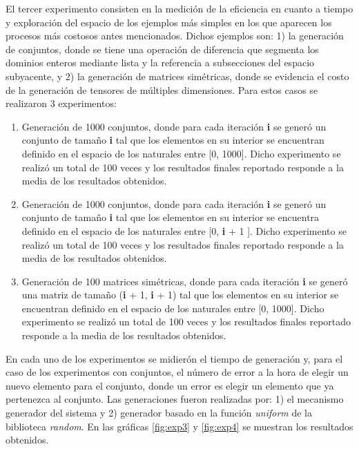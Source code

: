 El tercer experimento consisten en la medición de la eficiencia en cuanto a tiempo y exploración
del espacio de los ejemplos más simples en los que aparecen los procesos más costosos antes
mencionados. Dichos ejemplos son: 1) la generación de conjuntos, donde se tiene una operación de
diferencia que segmenta los dominios enteros mediante lista y la referencia a subsecciones del
espacio subyacente, y 2) la generación de matrices simétricas, donde se evidencia el costo de
la generación de tensores de múltiples dimensiones. Para estos casos se realizaron 3 experimentos:
\begin{enumerate}
      \item Generación de 1000 conjuntos, donde para cada iteración {\bf i} se generó un conjunto de tamaño {\bf i}
            tal que los elementos en su interior se encuentran definido en el espacio de los naturales entre
                  [0, 1000]. Dicho experimento se realizó un total de 100 veces y los resultados finales reportado
            responde a la media de los resultados obtenidos.
      \item Generación de 1000 conjuntos, donde para cada iteración {\bf i} se generó un conjunto de tamaño {\bf i}
            tal que los elementos en su interior se encuentra definido en el espacio de los naturales entre
                  [0, {\bf i} + 1 ]. Dicho experimento se realizó un total de 100 veces y los resultados finales reportado
            responde a la media de los resultados obtenidos.
      \item Generación de 100 matrices simétricas, donde para cada iteración {\bf i} se generó una matriz de
            tamaño ({\bf i} + 1, {\bf i} + 1) tal que los elementos en su interior se encuentran definido en el espacio de los
            naturales entre [0, 1000]. Dicho experimento se realizó un total de 100 veces y los resultados
            finales reportado responde a la media de los resultados obtenidos.
\end{enumerate}


En cada uno de los experimentos se midierón el tiempo de generación y, para el caso de los experimentos
con conjuntos, el número de error a la hora de elegir un nuevo elemento para el conjunto, donde un error
es elegir un elemento que ya pertenezca al conjunto. Las generaciones fueron realizadas por: 1) el
mecanismo generador del sistema y 2) generador basado en la función {\it uniform} de la biblioteca {\it random}.
En las gráficas \ref{fig:exp3} y \ref{fig:exp4} se muestran los resultados obtenidos.

